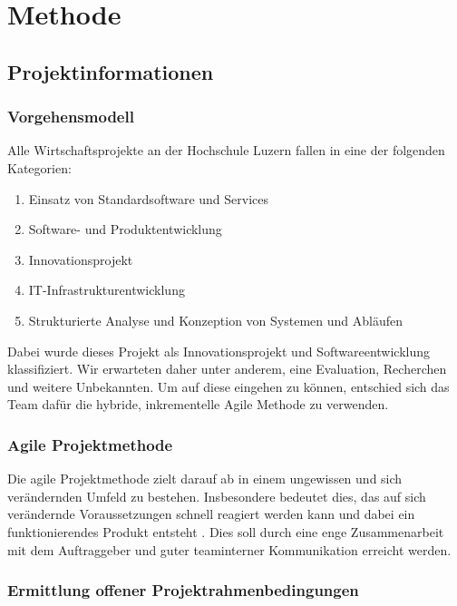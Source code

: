 \chapter{Methode}

\section{Projektinformationen}

\subsection{Vorgehensmodell}

Alle Wirtschaftsprojekte an der Hochschule Luzern fallen in eine der folgenden Kategorien:

\begin{enumerate}
	\item Einsatz von Standardsoftware und Services
	\item Software- und Produktentwicklung
	\item Innovationsprojekt
	\item IT-Infrastrukturentwicklung
	\item Strukturierte Analyse und Konzeption von Systemen und Abläufen
\end{enumerate}

Dabei wurde dieses Projekt als Innovationsprojekt und Softwareentwicklung klassifiziert. Wir erwarteten daher unter anderem, eine Evaluation, Recherchen und weitere Unbekannten. Um auf diese eingehen zu können, entschied sich das Team dafür die hybride, inkrementelle Agile Methode zu verwenden.

\subsection{Agile Projektmethode}

Die agile Projektmethode zielt darauf ab in einem ungewissen und sich verändernden Umfeld zu bestehen. Insbesondere bedeutet dies, das auf sich verändernde Voraussetzungen schnell reagiert werden kann und dabei ein funktionierendes Produkt entsteht \parencite{AgileAlliance2015}. Dies soll durch eine enge Zusammenarbeit mit dem Auftraggeber und guter teaminterner Kommunikation erreicht werden.

\parencite{BaumannWicki2018}

\subsection{Ermittlung offener Projektrahmenbedingungen}
\label{ch:evaluation}
